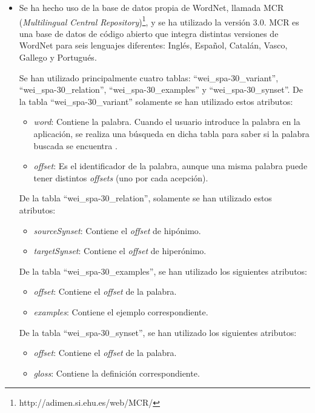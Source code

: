 \begin{itemize}
	\item Se ha hecho uso de la base de datos propia de WordNet, llamada MCR (\textit{Multilingual Central Repository})\footnote{http://adimen.si.ehu.es/web/MCR/}, y se ha utilizado la versión 3.0.  MCR es una base de datos de código abierto que integra distintas versiones de WordNet para seis lenguajes diferentes: Inglés, Español, Catalán, Vasco, Gallego y Portugués.  
	
	Se han utilizado principalmente cuatro tablas: ``wei\_spa-30\_variant'', ``wei\_spa-30\_relation'', ``wei\_spa-30\_examples'' y ``wei\_spa-30\_synset''. 
	De la tabla ``wei\_spa-30\_variant'' solamente se han utilizado estos atributos:
	\begin{itemize}
		\item \textit{word}: Contiene la palabra. Cuando el usuario introduce la palabra en la aplicación, se realiza una búsqueda en dicha tabla para saber si la palabra buscada se encuentra .
		\item \textit{offset}: Es el identificador de la palabra, aunque una misma palabra puede tener distintos \textit{offsets} (uno por cada acepción). 
	\end{itemize}

	De la tabla ``wei\_spa-30\_relation'', solamente se han utilizado estos atributos:
	\begin{itemize}
		\item \textit{sourceSynset}: Contiene el \textit{offset} de hipónimo.  
		\item \textit{targetSynset}: Contiene el \textit{offset} de hiperónimo.  
	\end{itemize}


	De la tabla ``wei\_spa-30\_examples'', se han utilizado los siguientes atributos:
		\begin{itemize}
		\item \textit{offset}: Contiene el \textit{offset} de la palabra.  
		\item \textit{examples}: Contiene el ejemplo correspondiente.
	\end{itemize}
	
	De la tabla ``wei\_spa-30\_synset'', se han utilizado los siguientes atributos:
	\begin{itemize}
		\item \textit{offset}: Contiene el \textit{offset} de la palabra.  
		\item \textit{gloss}: Contiene la definición correspondiente.
	\end{itemize} 



\end{itemize}
